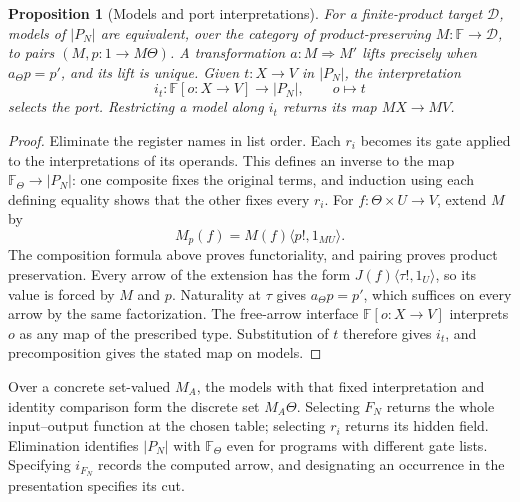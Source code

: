 \documentclass[11pt,a4paper]{article}
\newtheorem{proposition}[proposition]{Proposition}
\theoremstyle{definition}
\theoremstyle{remark}\newaliascnt{remark}{theorem}
\numberwithin{equation}{section}
\begin{document}
\begin{proposition}[Models and port interpretations]\label{prop:relative-models}
For a finite-product target \(\mathcal D\), models of \(|P_N|\) are equivalent, over the category of product-preserving \(M:\mathbb F\to\mathcal D\), to pairs \((M,p:1\to M\Theta)\). A transformation \(a:M\Rightarrow M'\) lifts precisely when \(a_\Theta p=p'\), and its lift is unique. Given \(t:X\to V\) in \(|P_N|\), the interpretation
\[
 i_t:\mathbb F[o:X\to V]\longrightarrow |P_N|,\qquad o\longmapsto t
\]
selects the port. Restricting a model along \(i_t\) returns its map \(MX\to MV\).
\end{proposition}
\begin{proof}
Eliminate the register names in list order. Each \(r_i\) becomes its gate applied to the interpretations of its operands. This defines an inverse to the map \(\mathbb F_\Theta\to |P_N|\): one composite fixes the original terms, and induction using each defining equality shows that the other fixes every \(r_i\). For \(f:\Theta\times U\to V\), extend \(M\) by
\[
 M_p(f)=M(f)\langle p!,1_{MU}\rangle .
\]
The composition formula above proves functoriality, and pairing proves product preservation. Every arrow of the extension has the form \(J(f)\langle\tau!,1_U\rangle\), so its value is forced by \(M\) and \(p\). Naturality at \(\tau\) gives \(a_\Theta p=p'\), which suffices on every arrow by the same factorization. The free-arrow interface \(\mathbb F[o:X\to V]\) interprets \(o\) as any map of the prescribed type. Substitution of \(t\) therefore gives \(i_t\), and precomposition gives the stated map on models.
\end{proof}

Over a concrete set-valued \(M_A\), the models with that fixed interpretation and identity comparison form the discrete set \(M_A\Theta\). Selecting \(F_N\) returns the whole input--output function at the chosen table; selecting \(r_i\) returns its hidden field. Elimination identifies \(|P_N|\) with \(\mathbb F_\Theta\) even for programs with different gate lists. Specifying \(i_{F_N}\) records the computed arrow, and designating an occurrence in the presentation specifies its cut.
\end{document}
